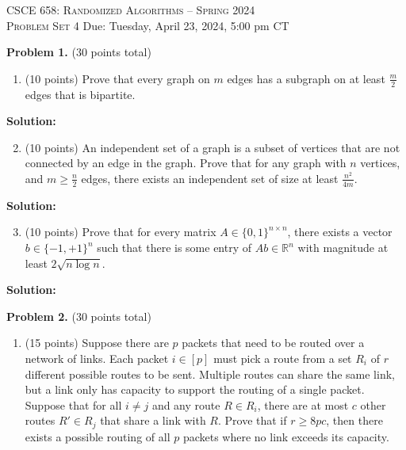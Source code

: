 \documentclass[11pt]{article}
\begin{document}
\begin{center}
{\Large\textsc{CSCE 658: Randomized Algorithms -- Spring 2024 \\ 
Problem Set 4}}
\vskip 0.1in
Due: Tuesday, April 23, 2024, 5:00 pm CT
\end{center}


\noindent
\textbf{Problem 1.} (30 points total)
\begin{enumerate}
\item (10 points)
Prove that every graph on $m$ edges has a subgraph on at least $\frac{m}{2}$ edges that is bipartite.
\end{enumerate}

\noindent\textbf{Solution:}

\begin{enumerate}
\setcounter{enumi}{1}
\item (10 points)
An independent set of a graph is a subset of vertices that are not connected by an edge in the graph. 
Prove that for any graph with $n$ vertices, and $m\ge\frac{n}{2}$ edges, there exists an independent set of
size at least $\frac{n^2}{4m}$. 
\end{enumerate}

\noindent\textbf{Solution:}

\begin{enumerate}
\setcounter{enumi}{2}
\item (10 points)
Prove that for every matrix $A\in\{0,1\}^{n\times n}$, there exists a vector $b\in\{-1,+1\}^n$ such that there is some entry of $Ab\in\mathbb{R}^n$ with magnitude at least $2\sqrt{n\log n}$. 
\end{enumerate}

\noindent\textbf{Solution:}




\newpage\noindent
\textbf{Problem 2.} (30 points total)
\begin{enumerate}
\item (15 points)
Suppose there are $p$ packets that need to be routed over a network of links. 
Each packet $i\in[p]$ must pick a route from a set $R_i$ of $r$ different possible routes to be sent. 
Multiple routes can share the same link, but a link only has capacity to support the routing of a single packet. 
Suppose that for all $i\neq j$ and any route $R\in R_i$, there are at most $c$ other routes $R'\in R_j$ that share a link with $R$. 
Prove that if $r\ge 8pc$, then there exists a possible routing of all $p$ packets where no link exceeds its capacity.
\end{enumerate}
\end{document}
